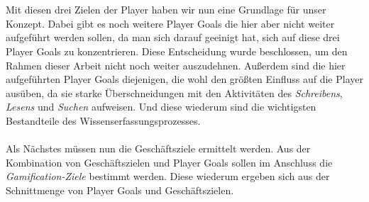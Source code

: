 \documentclass[a4paper,12pt]{scrartcl}
\begin{document}
\\\\
Mit diesen drei Zielen der Player haben wir nun eine Grundlage für unser Konzept. Dabei gibt es noch weitere Player Goals die hier aber nicht weiter aufgeführt werden sollen, da man sich darauf geeinigt hat, sich auf diese drei Player Goals zu konzentrieren. Diese Entscheidung wurde beschlossen, um den Rahmen dieser Arbeit nicht noch weiter auszudehnen. Außerdem sind die hier aufgeführten Player Goals diejenigen, die wohl den größten Einfluss auf die Player ausüben, da sie starke Überschneidungen mit den Aktivitäten des \textit{Schreibens}, \textit{Lesens} und \textit{Suchen} aufweisen. Und diese wiederum sind die wichtigsten Bestandteile des Wissenserfassungsprozesses.
\\\\
Als Nächstes müssen nun die Geschäftsziele ermittelt werden. Aus der Kombination von Geschäftszielen und Player Goals sollen im Anschluss die \textit{Gamification-Ziele} bestimmt werden. Diese wiederum ergeben sich aus der Schnittmenge von Player Goals und Geschäftszielen.  
 
\end{document}
